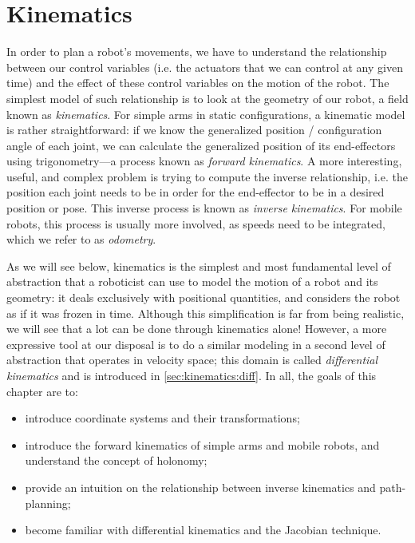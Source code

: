 \chapter{Kinematics}\label{chap:kinematics}

In order to plan a robot's movements, we have to understand the relationship between our control variables (i.e. the actuators that we can control at any given time) and the effect of these control variables on the motion of the robot.
The simplest model of such relationship is to look at the geometry of our robot, a field known as \textsl{kinematics}.
For simple arms in static configurations, a kinematic model is rather straightforward: if we know the generalized position / configuration angle of each joint, we can calculate the generalized position of its end-effectors using trigonometry---a process known as \textsl{forward kinematics}.
A more interesting, useful, and complex problem is trying to compute the inverse relationship, i.e. the position each joint needs to be in order for the end-effector to be in a desired position or pose. This inverse process is known as \textsl{inverse kinematics}.
For mobile robots, this process is usually more involved, as speeds need to be integrated, which we refer to as \textsl{odometry}.

As we will see below, kinematics is the simplest and most fundamental level of abstraction that a roboticist can use to model the motion of a robot and its geometry: it deals exclusively with positional quantities, and considers the robot as if it was frozen in time. Although this simplification is far from being realistic, we will see that a lot can be done through kinematics alone! However, a more expressive tool at our disposal is to do a similar modeling in a second level of abstraction that operates in velocity space; this domain is called \textsl{differential kinematics} and is introduced in \cref{sec:kinematics:diff}.
In all, the goals of this chapter are to:

\begin{itemize}
\item introduce coordinate systems and their transformations;
\item introduce the forward kinematics of simple arms and mobile robots, and understand the concept of holonomy;
\item provide an intuition on the relationship between inverse kinematics and path-planning;
\item become familiar with differential kinematics and the Jacobian technique.
\end{itemize}

